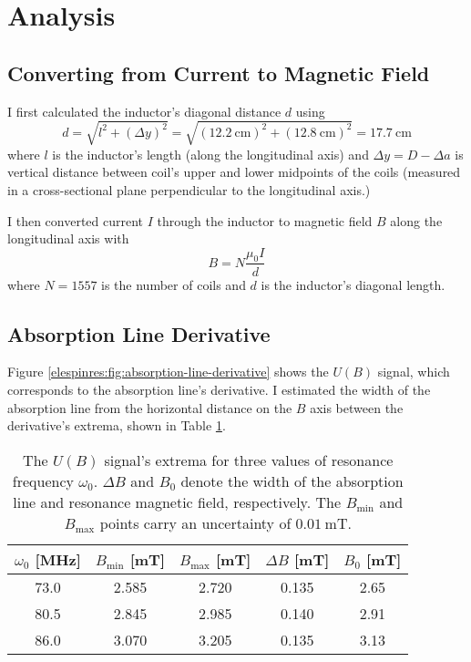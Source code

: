 \documentclass[11pt, a4paper]{article}
\begin{document}
\section{Analysis} \label{elespinres:s:analysis}
\subsection{Converting from Current to Magnetic Field}
I first calculated the inductor's diagonal distance $ d $ using
\begin{equation*}
	d = \sqrt{l^{2} + (\Delta y)^{2}} = \sqrt{(\SI{12.2}{\centi \meter})^{2} + (\SI{12.8}{\centi \meter})^{2}} = \SI{17.7}{\centi \meter}
\end{equation*}
where $ l $ is the inductor's length (along the longitudinal axis) and $ \Delta y  = D - \Delta a $ is vertical distance between coil's upper and lower midpoints of the coils (measured in a cross-sectional plane perpendicular to the longitudinal axis.)


I then converted current $ I $ through the inductor to magnetic field $ B $ along the longitudinal axis with
\begin{equation*}
	B = N\frac{\mu_{0}I}{d}
\end{equation*}
where $ N = 1557 $ is the number of coils and $ d $ is the inductor's diagonal length.

\subsection{Absorption Line Derivative}
Figure \ref{elespinres:fig:absorption-line-derivative} shows the $ U(B) $ signal, which corresponds to the absorption line's derivative. I estimated the width of the absorption line from the horizontal distance on the $ B $ axis between the derivative's extrema, shown in Table \ref{elespinres:table:B-extrema}.

\begin{table}[h]
\begin{center}
 \begin{tabular}{c|c|c|c|c}
     $ \omega_{0} $ [\si{\mega \hertz}] &  $ B_{\text{min}} $ [\si{\milli \tesla}] &  $ B_{\text{max}} $ [\si{\milli \tesla}] &  $ \Delta B $ [\si{\milli \tesla}] & $ B_{0} $ [\si{\milli \tesla}] \\
     \hline
     73.0 & 2.585 & 2.720 & 0.135 & 2.65\\
     80.5 & 2.845 & 2.985 & 0.140 & 2.91\\
     86.0 & 3.070 & 3.205 & 0.135 & 3.13
	\end{tabular}
	\caption{The $ U(B) $ signal's extrema for three values of resonance frequency $ \omega_{0} $. $ \Delta B $ and $ B_{0} $ denote the width of the absorption line and resonance magnetic field, respectively. The $ B_{\text{min}} $ and $ B_{\text{max}} $ points carry an uncertainty of $ \SI{0.01}{\milli \tesla} $.}
	\label{elespinres:table:B-extrema}
\end{center}
\end{table}
\end{document}
